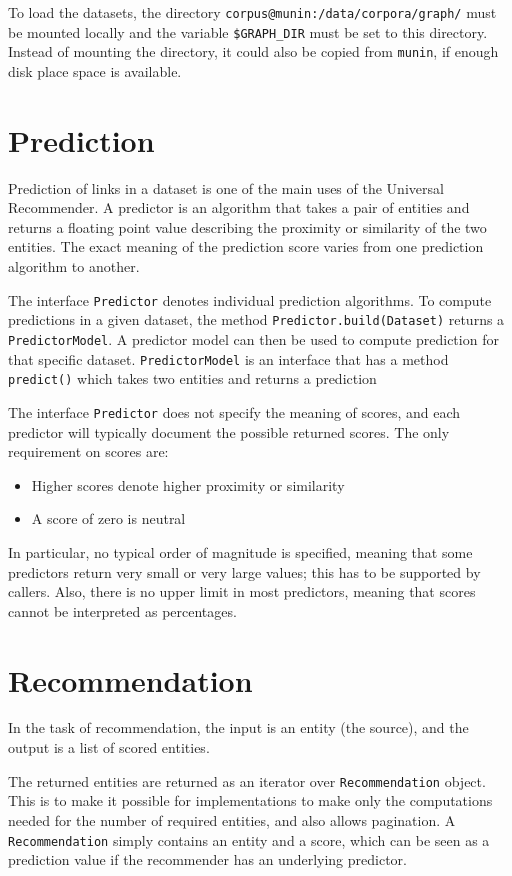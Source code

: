\documentclass{article}
\begin{document}
To load the datasets, the directory
\texttt{corpus@munin:/data/corpora/graph/} must be mounted locally and
the variable \texttt{\$GRAPH\_DIR} must be set to
this directory.  Instead of mounting the directory, it could also be
copied from \texttt{munin}, if enough disk place space is available. 

\section{Prediction}
Prediction of links in a dataset is one of the main uses of the
Universal Recommender.  A predictor is an algorithm that takes a pair of
entities and returns a floating point value describing the proximity or
similarity of the two entities.  The exact meaning of the
prediction score varies from one prediction algorithm to another.

The interface \texttt{Predictor} denotes individual prediction
algorithms.  To compute predictions in a given dataset, the method
\texttt{Predictor.build(Dataset)} returns a \texttt{PredictorModel}.  A
predictor model can then be used to compute prediction for that specific
dataset.  \texttt{PredictorModel} is an interface that has a method
\texttt{predict()} which takes two entities and returns a prediction

The interface \texttt{Predictor} does not specify the meaning of
scores, and each predictor will typically document the possible returned
scores.  The only requirement on scores are:
\begin{itemize}
\item Higher scores denote higher proximity or similarity
\item A score of zero is neutral
\end{itemize}
In particular, no typical order of magnitude is specified, meaning that
some predictors return very small or very large values; this has to be
supported by callers.  Also, there is no upper limit in most predictors,
meaning that scores cannot be interpreted as percentages.

\section{Recommendation}
In the task of recommendation, the input is an entity (the source), and
the output is a list of scored entities.  

The returned entities are returned as an iterator over
\texttt{Recommendation} object.  This is to make it possible for
implementations to make only the computations needed for the number of
required entities, and also allows pagination.  A
\texttt{Recommendation} simply contains an entity and a score, which
can be seen as a prediction value if the recommender has an underlying
predictor. 
\end{document}
